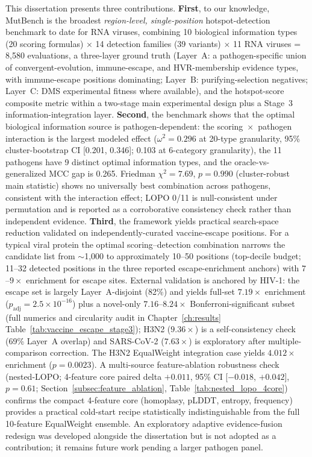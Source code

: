 This dissertation presents three contributions.
\textbf{First}, to our knowledge, MutBench is the broadest \emph{region-level, single-position} hotspot-detection benchmark to date for RNA viruses, combining 10 biological information types (20 scoring formulas) $\times$ 14 detection families (39 variants) $\times$ 11 RNA viruses = 8{,}580 evaluations, a three-layer ground truth (Layer~A: a pathogen-specific union of convergent-evolution, immune-escape, and HVR-membership evidence types, with immune-escape positions dominating; Layer~B: purifying-selection negatives; Layer~C: DMS experimental fitness where available), and the hotspot-score composite metric within a two-stage main experimental design plus a Stage~3 information-integration layer.
\textbf{Second}, the benchmark shows that the optimal biological information source is pathogen-dependent: the scoring~$\times$~pathogen interaction is the largest modeled effect ($\omega^2=0.296$ at 20-type granularity, 95\% cluster-bootstrap CI [0.201, 0.346]; 0.103 at 6-category granularity), the 11 pathogens have 9 distinct optimal information types, and the oracle-vs-generalized MCC gap is 0.265.
Friedman $\chi^2=7.69$, $p=0.990$ (cluster-robust main statistic) shows no universally best combination across pathogens, consistent with the interaction effect; LOPO 0/11 is null-consistent under permutation and is reported as a corroborative consistency check rather than independent evidence.
\textbf{Third}, the framework yields practical search-space reduction validated on independently-curated vaccine-escape positions. For a typical viral protein the optimal scoring--detection combination narrows the candidate list from $\sim$1{,}000 to approximately 10--50 positions (top-decile budget; 11--32 detected positions in the three reported escape-enrichment anchors) with $7$--$9\times$ enrichment for escape sites. External validation is anchored by HIV-1: the escape set is largely Layer~A-disjoint (82\%) and yields full-set $7.19\times$ enrichment ($p_{\text{adj}} = 2.5 \times 10^{-16}$) plus a novel-only $7.16$--$8.24\times$ Bonferroni-significant subset (full numerics and circularity audit in Chapter~\ref{ch:results} Table~\ref{tab:vaccine_escape_stage3}); H3N2 ($9.36\times$) is a self-consistency check (69\% Layer~A overlap) and SARS-CoV-2 ($7.63\times$) is exploratory after multiple-comparison correction. The H3N2 EqualWeight integration case yields $4.012\times$ enrichment ($p = 0.0023$). A multi-source feature-ablation robustness check (nested-LOPO; 4-feature core paired delta $+0.011$, 95\% CI [$-0.018$, $+0.042$], $p = 0.61$; Section~\ref{subsec:feature_ablation}, Table~\ref{tab:nested_lopo_4core}) confirms the compact 4-feature core (homoplasy, pLDDT, entropy, frequency) provides a practical cold-start recipe statistically indistinguishable from the full 10-feature EqualWeight ensemble.
An exploratory adaptive evidence-fusion redesign was developed alongside the dissertation but is not adopted as a contribution; it remains future work pending a larger pathogen panel.

